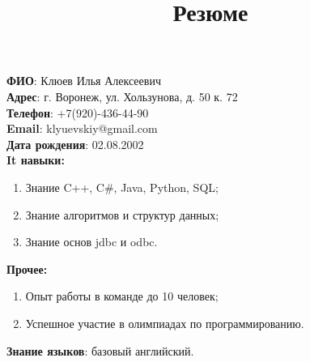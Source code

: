 \documentclass[14pt,a4paper]{article}
\title{Резюме}
\begin{document}
	\maketitle
	\noindent\textbf{ФИО}: Клюев Илья Алексеевич\\
	\textbf{Адрес}: г. Воронеж, ул. Хользунова, д. 50 к. 72\\
	\textbf{Телефон}: +7(920)-436-44-90\\
	\textbf{Email}: klyuevskiy@gmail.com\\
	\textbf{Дата рождения}: 02.08.2002\\
	\textbf{It навыки:}
	\begin{enumerate}
		\item Знание C++, C\#, Java, Python, SQL;
		\item Знание алгоритмов и структур данных;
		\item Знание основ jdbc и odbc.
	\end{enumerate}
	\textbf{Прочее:}
	\begin{enumerate}
		\item Опыт работы в команде до 10 человек;
		\item Успешное участие в олимпиадах по программированию.
	\end{enumerate}
	\textbf{Знание языков}: базовый английский.
\end{document}
